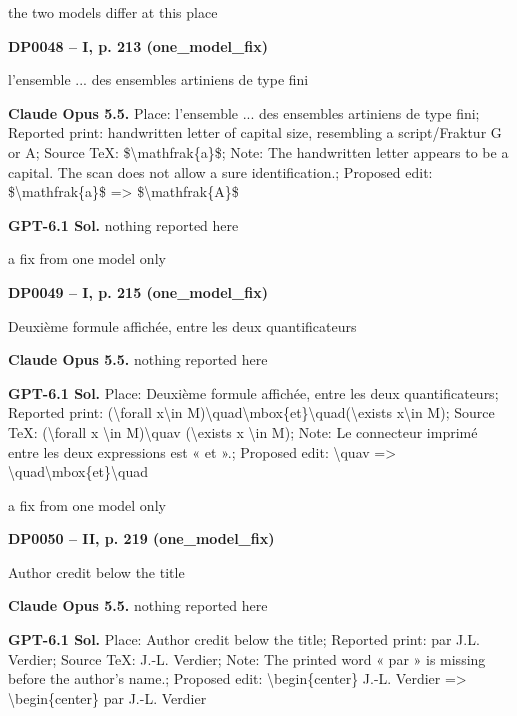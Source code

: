 the two models differ at this place\par
\par\noindent\hypertarget{DP0048}{}\textbf{DP0048 -- I, p. 213 (one\_model\_fix)}\par
l'ensemble ... des ensembles artiniens de type fini\par
\textbf{Claude Opus 5.5.} Place: l'ensemble ... des ensembles artiniens de type fini; Reported print: handwritten letter of capital size, resembling a script/Fraktur G or A; Source TeX: \$\textbackslash{}mathfrak\{a\}\$; Note: The handwritten letter appears to be a capital. The scan does not allow a sure identification.; Proposed edit: \$\textbackslash{}mathfrak\{a\}\$ =\allowbreak > \$\textbackslash{}mathfrak\{A\}\$\par
\textbf{GPT-6.1 Sol.} nothing reported here\par
a fix from one model only\par
\par\noindent\hypertarget{DP0049}{}\textbf{DP0049 -- I, p. 215 (one\_model\_fix)}\par
Deuxième formule affichée, entre les deux quantificateurs\par
\textbf{Claude Opus 5.5.} nothing reported here\par
\textbf{GPT-6.1 Sol.} Place: Deuxième formule affichée, entre les deux quantificateurs; Reported print: (\textbackslash{}forall x\textbackslash{}in M)\textbackslash{}quad\textbackslash{}mbox\{et\}\textbackslash{}quad(\textbackslash{}exists x\textbackslash{}in M); Source TeX: (\textbackslash{}forall x \textbackslash{}in M)\textbackslash{}quav (\textbackslash{}exists x \textbackslash{}in M); Note: Le connecteur imprimé entre les deux expressions est « et ».; Proposed edit: \textbackslash{}quav =\allowbreak > \textbackslash{}quad\textbackslash{}mbox\{et\}\textbackslash{}quad\par
a fix from one model only\par
\par\noindent\hypertarget{DP0050}{}\textbf{DP0050 -- II, p. 219 (one\_model\_fix)}\par
Author credit below the title\par
\textbf{Claude Opus 5.5.} nothing reported here\par
\textbf{GPT-6.1 Sol.} Place: Author credit below the title; Reported print: par J.L. Verdier; Source TeX: J.-L. Verdier; Note: The printed word « par » is missing before the author's name.; Proposed edit: \textbackslash{}begin\{center\} J.-L. Verdier =\allowbreak > \textbackslash{}begin\{center\} par J.-L. Verdier\par

